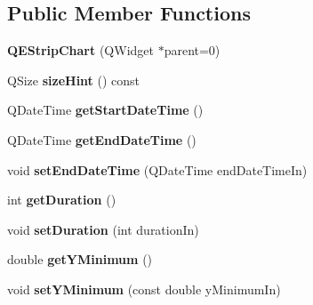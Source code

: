 \subsection*{Public Member Functions}
\begin{DoxyCompactItemize}
\item 
\hypertarget{classQEStripChart_a7f6b0e9bb943f160e2bb715c89c0b4a9}{
{\bfseries QEStripChart} (QWidget $\ast$parent=0)}
\label{classQEStripChart_a7f6b0e9bb943f160e2bb715c89c0b4a9}

\item 
\hypertarget{classQEStripChart_ad09034a6850ce5dde69e6fc4bdb1d30c}{
QSize {\bfseries sizeHint} () const }
\label{classQEStripChart_ad09034a6850ce5dde69e6fc4bdb1d30c}

\item 
\hypertarget{classQEStripChart_a72f03ddce33852ea70d6bc356a22cc1e}{
QDateTime {\bfseries getStartDateTime} ()}
\label{classQEStripChart_a72f03ddce33852ea70d6bc356a22cc1e}

\item 
\hypertarget{classQEStripChart_a30896b32c84b5b8c51c2431c51d96520}{
QDateTime {\bfseries getEndDateTime} ()}
\label{classQEStripChart_a30896b32c84b5b8c51c2431c51d96520}

\item 
\hypertarget{classQEStripChart_a7e198efa2056cbc8cf1001af282e09d4}{
void {\bfseries setEndDateTime} (QDateTime endDateTimeIn)}
\label{classQEStripChart_a7e198efa2056cbc8cf1001af282e09d4}

\item 
\hypertarget{classQEStripChart_a0cb1e8404dbab4652e537fcf958b33ba}{
int {\bfseries getDuration} ()}
\label{classQEStripChart_a0cb1e8404dbab4652e537fcf958b33ba}

\item 
\hypertarget{classQEStripChart_a4231999600ac5b141719c172780f4b21}{
void {\bfseries setDuration} (int durationIn)}
\label{classQEStripChart_a4231999600ac5b141719c172780f4b21}

\item 
\hypertarget{classQEStripChart_aedfea20674677f31b925ba29efa2cae7}{
double {\bfseries getYMinimum} ()}
\label{classQEStripChart_aedfea20674677f31b925ba29efa2cae7}

\item 
\hypertarget{classQEStripChart_a33f3af01c69e651d2384652f797e8115}{
void {\bfseries setYMinimum} (const double yMinimumIn)}
\label{classQEStripChart_a33f3af01c69e651d2384652f797e8115}


\end{DoxyCompactItemize}
